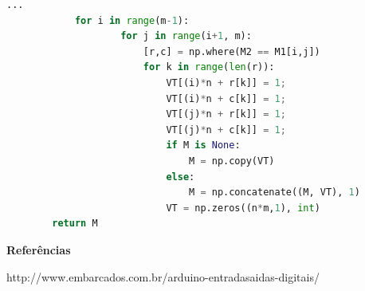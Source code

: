 \documentclass[t]{beamer}
\begin{document}
\begin{frame}[fragile]

	\begin{lstlisting}[language=Python]
			... 
			for i in range(m-1):
					for j in range(i+1, m):
						[r,c] = np.where(M2 == M1[i,j])
						for k in range(len(r)):
							VT[(i)*n + r[k]] = 1;
							VT[(i)*n + c[k]] = 1;
							VT[(j)*n + r[k]] = 1;
							VT[(j)*n + c[k]] = 1;
							if M is None:
								M = np.copy(VT)
							else:
								M = np.concatenate((M, VT), 1)
							VT = np.zeros((n*m,1), int)
		return M
	\end{lstlisting}
\end{frame}

\begin{frame}[allowframebreaks]

\textbf{Referências}

\begin{itemize}
\begin{small}
\item http://www.embarcados.com.br/arduino-entradasaidas-digitais/
\end{small}
\end{itemize}
\end{frame}
\end{document}
